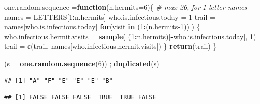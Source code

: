 \documentclass[]{book}
\newenvironment{Shaded}{\begin{snugshade}}{\end{snugshade}}
\newcommand{\CommentTok}[1]{\textcolor[rgb]{0.56,0.35,0.01}{\textit{#1}}}
\newcommand{\ControlFlowTok}[1]{\textcolor[rgb]{0.13,0.29,0.53}{\textbf{#1}}}
\newcommand{\DataTypeTok}[1]{\textcolor[rgb]{0.13,0.29,0.53}{#1}}
\newcommand{\DecValTok}[1]{\textcolor[rgb]{0.00,0.00,0.81}{#1}}
\newcommand{\KeywordTok}[1]{\textcolor[rgb]{0.13,0.29,0.53}{\textbf{#1}}}
\newcommand{\NormalTok}[1]{#1}
\newcommand{\OperatorTok}[1]{\textcolor[rgb]{0.81,0.36,0.00}{\textbf{#1}}}
\newcommand{\StringTok}[1]{\textcolor[rgb]{0.31,0.60,0.02}{#1}}
\begin{document}
\begin{Shaded}
\begin{Highlighting}[]
\NormalTok{one.random.sequence =}\ControlFlowTok{function}\NormalTok{(}\DataTypeTok{n.hermits=}\DecValTok{6}\NormalTok{)\{ }\CommentTok{# max 26, for 1-letter names}
\NormalTok{    names =}\StringTok{ }\NormalTok{LETTERS[}\DecValTok{1}\OperatorTok{:}\NormalTok{n.hermits]}
\NormalTok{    who.is.infectious.today =}\StringTok{ }\DecValTok{1}
\NormalTok{    trail =}\StringTok{ }\NormalTok{names[who.is.infectious.today]}
    \ControlFlowTok{for}\NormalTok{(visit }\ControlFlowTok{in}\NormalTok{ (}\DecValTok{1}\OperatorTok{:}\NormalTok{(n.hermits}\DecValTok{-1}\NormalTok{)) ) \{}
\NormalTok{        who.infectious.hermit.visits =}\StringTok{ }
\StringTok{         }\KeywordTok{sample}\NormalTok{( (}\DecValTok{1}\OperatorTok{:}\NormalTok{n.hermits)[}\OperatorTok{-}\NormalTok{who.is.infectious.today], }\DecValTok{1}\NormalTok{)}
\NormalTok{       trail =}\StringTok{ }\KeywordTok{c}\NormalTok{(trail, names[who.infectious.hermit.visits])}
\NormalTok{    \}}
    \KeywordTok{return}\NormalTok{(trail)}
\NormalTok{\}}

\NormalTok{(}\DataTypeTok{s =} \KeywordTok{one.random.sequence}\NormalTok{(}\DecValTok{6}\NormalTok{)) ; }\KeywordTok{duplicated}\NormalTok{(s)}
\end{Highlighting}
\end{Shaded}

\begin{verbatim}
## [1] "A" "F" "E" "E" "E" "B"
\end{verbatim}

\begin{verbatim}
## [1] FALSE FALSE FALSE  TRUE  TRUE FALSE
\end{verbatim}
\end{document}
